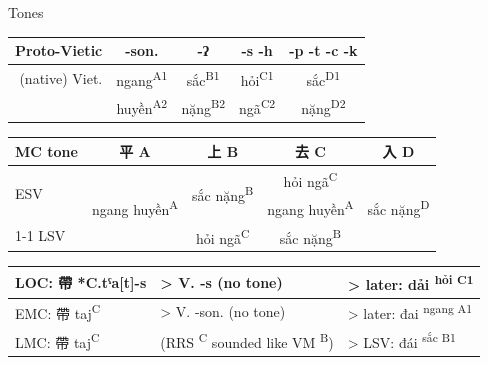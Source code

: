\documentclass{beamer}
\begin{document}
\begin{frame}[fragile]{Tones}

\begin{tabular}{r|c c c c}
    Proto-Vietic & -son. & -ʔ & -s -h & -p -t -c -k\\ \hline
    (native) Viet. & ngang\textsuperscript{A1} & sắc\textsuperscript{B1} & hỏi\textsuperscript{C1} & sắc\textsuperscript{D1}\\
     & huyền\textsuperscript{A2} & nặng\textsuperscript{B2} & ngã\textsuperscript{C2} & nặng\textsuperscript{D2}\\ 
\end{tabular}

\bigskip
\begin{tabular}{l|c c c c}
MC tone & 平 A & 上 B & 去 C & 入 D\\ \hline 
\multirow{2}{*}{ESV} & \multirow{3}{*}{ngang huyền\textsuperscript{A}} & \multirow{2}{*}{sắc nặng\textsuperscript{B}} & hỏi ngã\textsuperscript{C} & \multirow{3}{*}{sắc nặng\textsuperscript{D}}\\
 & & & ngang huyền\textsuperscript{A} & \\ \cline{1-1} \cline{3-4}
LSV & & hỏi ngã\textsuperscript{C} & sắc nặng\textsuperscript{B} & \\
\end{tabular}

\bigskip

\begin{tabular}{l l l}
LOC: 帶 *C.tˤa[t]-s & > V. -s (no tone) & > later: dải \textsuperscript{hỏi C1}\\ \hline
EMC: 帶 taj\textsuperscript{C} & > V. -son. (no tone) & > later: đai \textsuperscript{ngang A1}\\ \hline
LMC: 帶 taj\textsuperscript{C} & (RRS \textsuperscript{C} sounded like VM \textsuperscript{B}) & > LSV: đái \textsuperscript{sắc B1}\\ 
\end{tabular}
\end{frame}
\end{document}
